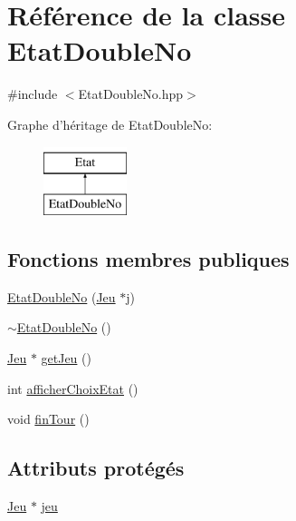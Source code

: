 \hypertarget{class_etat_double_no}{\section{Référence de la classe Etat\-Double\-No}
\label{class_etat_double_no}
}


{\ttfamily \#include $<$Etat\-Double\-No.\-hpp$>$}

Graphe d'héritage de Etat\-Double\-No\-:\begin{figure}[H]
\begin{center}
\leavevmode
\includegraphics[height=2.000000cm]{class_etat_double_no}
\end{center}
\end{figure}
\subsection*{Fonctions membres publiques}
\begin{DoxyCompactItemize}
\item 
\hyperlink{class_etat_double_no_ac89c20bba357b6fff0d3d8aeead6b894}{Etat\-Double\-No} (\hyperlink{class_jeu}{Jeu} $\ast$j)
\item 
\hyperlink{class_etat_double_no_a5833701f2f11e8902ceb31626076dd2e}{$\sim$\-Etat\-Double\-No} ()
\item 
\hyperlink{class_jeu}{Jeu} $\ast$ \hyperlink{class_etat_double_no_a51f05fabae25436634e3b8c1ecdf5aef}{get\-Jeu} ()
\item 
int \hyperlink{class_etat_double_no_a01af5700d0b3bd927af0d65f95395256}{afficher\-Choix\-Etat} ()
\item 
void \hyperlink{class_etat_double_no_a888b25f87b975d3d92bfaa2cf9ce064d}{fin\-Tour} ()
\end{DoxyCompactItemize}
\subsection*{Attributs protégés}
\begin{DoxyCompactItemize}
\item 
\hyperlink{class_jeu}{Jeu} $\ast$ \hyperlink{class_etat_double_no_ac1166f725800d6a7f9c0c83bf6d7665e}{jeu}
\end{DoxyCompactItemize}


